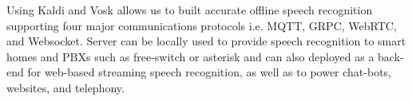 Using Kaldi and Vosk \cite{alphacep_alphacepvosk-server_2022} allows us to built accurate offline speech recognition supporting four major communications protocols i.e. MQTT, GRPC, WebRTC, and Websocket. Server can be locally used to provide speech recognition to smart homes and PBXs such as free-switch or asterisk and can also deployed as a back-end for web-based streaming speech recognition, as well as to power chat-bots, websites, and telephony.






